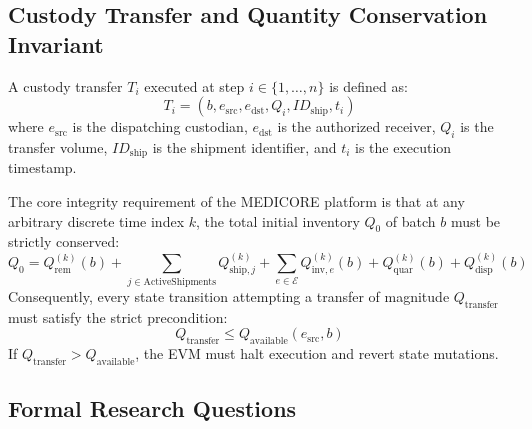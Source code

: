 \documentclass[pdflatex,sn-mathphys-num]{sn-jnl}
\theoremstyle{thmstyleone}
\theoremstyle{thmstyletwo}
\theoremstyle{thmstylethree}
\begin{document}
\subsection{Custody Transfer and Quantity Conservation Invariant}

A custody transfer $T_i$ executed at step $i \in \{1, \dots, n\}$ is defined as:
\begin{equation}
T_i = (b, e_{\text{src}}, e_{\text{dst}}, Q_i, ID_{\text{ship}}, t_i)
\end{equation}
where $e_{\text{src}}$ is the dispatching custodian, $e_{\text{dst}}$ is the authorized receiver, $Q_i$ is the transfer volume, $ID_{\text{ship}}$ is the shipment identifier, and $t_i$ is the execution timestamp.

The core integrity requirement of the MEDICORE platform is that at any arbitrary discrete time index $k$, the total initial inventory $Q_0$ of batch $b$ must be strictly conserved:
\begin{equation}
Q_0 = Q_{\text{rem}}^{(k)}(b) + \sum_{j \in \text{ActiveShipments}} Q_{\text{ship}, j}^{(k)} + \sum_{e \in \mathcal{E}} Q_{\text{inv}, e}^{(k)}(b) + Q_{\text{quar}}^{(k)}(b) + Q_{\text{disp}}^{(k)}(b)
\label{eq:full-conservation}
\end{equation}
Consequently, every state transition attempting a transfer of magnitude $Q_{\text{transfer}}$ must satisfy the strict precondition:
\begin{equation}
Q_{\text{transfer}} \le Q_{\text{available}}(e_{\text{src}}, b)
\label{eq:precondition}
\end{equation}
If $Q_{\text{transfer}} > Q_{\text{available}}$, the EVM must halt execution and revert state mutations.

\subsection{Formal Research Questions}
\end{document}
